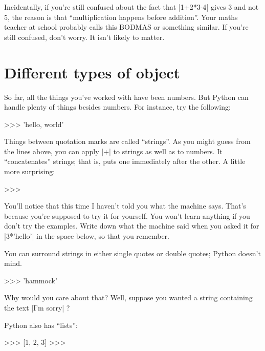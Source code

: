 \documentclass[pdftex]{wsheet}
\begin{document}
Incidentally, if you're still confused about the fact that
|1+2*3-4| gives 3 and not 5, the reason is that ``multiplication
happens before addition''. Your maths teacher at school probably
calls this BODMAS or something similar. If you're still confused,
don't worry. It isn't likely to matter.

\section{Different types of object}
So far, all the things you've worked with have been numbers. But
Python can handle plenty of things besides numbers. For instance,
try the following:

\begin{interaction}
>>> 
'hello, world'
\end{interaction}

Things between quotation marks are called ``strings''. As you
might guess from the lines above, you can apply |+| to strings
as well as to numbers. It ``concatenates'' strings; that is,
puts one immediately after the other. A little more surprising:

\begin{interaction}
>>> 
\end{interaction}

\begin{note}
You'll notice that this time I haven't told you what the machine
says. That's because you're supposed to try it for yourself.
You won't learn anything if you don't try the examples. Write
down what the machine said when you asked it for |3*'hello'|
in the space below, so that you remember.
\vspace{1cm}
\end{note}

You can surround strings in either single quotes or double quotes;
Python doesn't mind.

\begin{interaction}
>>> 
'hammock'
\end{interaction}

Why would you care about that? Well, suppose you wanted a string
containing the text |I'm sorry| ?

Python also has ``lists'':

\begin{interaction}
>>> \T{[1,2,3]}
[1, 2, 3]
>>> \T{[1,2,3] + [7,8]}
\end{interaction}
\end{document}
